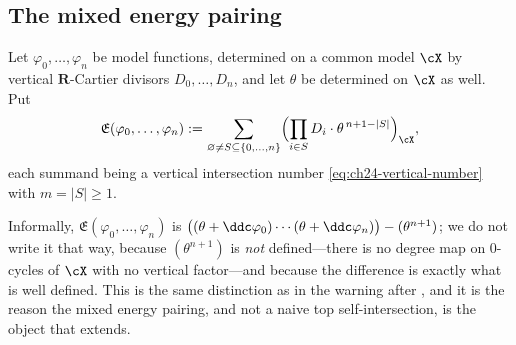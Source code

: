 \subsection{The mixed energy pairing}
\label{sec:ch24-energy-pairing}

\begin{definition}
\label{def:ch24-mixed-energy}
Let \(\varphi_0,\ldots,\varphi_n\) be model functions, determined on a common
model \(\cX\) by vertical \(\mathbf R\)-Cartier divisors
\(D_0,\ldots,D_n\), and let \(\theta\) be determined on \(\cX\) as well.
Put
\begin{equation}
\label{eq:ch24-mixed-energy}
 \mathfrak E(\varphi_0,\ldots,\varphi_n)
 :=\sum_{\varnothing\neq S\subseteq\{0,\ldots,n\}}
    \Bigl(\prod_{i\in S}D_i\cdot\theta^{\,n+1-|S|}\Bigr)_{\cX},
\end{equation}
each summand being a vertical intersection number
\eqref{eq:ch24-vertical-number} with \(m=|S|\geq1\).
\end{definition}

Informally, \(\mathfrak E(\varphi_0,\ldots,\varphi_n)\) is
\(\bigl((\theta+\ddc\varphi_0)\cdots(\theta+\ddc\varphi_n)\bigr)
 -(\theta^{n+1})\); we do not write it that way, because
\((\theta^{n+1})\) is \emph{not} defined---there is no degree map on
\(0\)-cycles of \(\cX\) with no vertical factor---and because the difference
is exactly what is well defined.  This is the same distinction as in the
warning after , and it is the reason the
mixed energy pairing, and not a naive top self-intersection, is the object
that extends.

